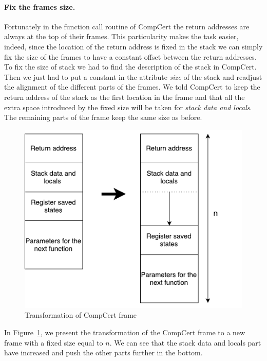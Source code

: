 \documentclass[11pt]{sdm}
\begin{document}
\paragraph{Fix the frames size.}
\label{par:Fix the frames size}

Fortunately in the function call routine of CompCert the return addresses are always at the top of their frames.
This particularity makes the task easier, indeed, since the location of the return address is fixed in the stack we can simply fix the size of the frames to have a constant offset between the return addresses. \\
To fix the size of stack we had to find the description of the stack in CompCert. Then we just had to put a constant in the attribute \textit{size} of the stack and readjust the alignment of the different parts of the frames. We told CompCert to keep the return address of the stack as the first location in the frame and that all the extra space introduced by the fixed size will be taken for  \textit{stack data and locals}. The remaining parts of the frame keep the same size as before.

\begin{figure}[!ht]
\centering
\includegraphics[scale=0.6]{images/frame_transform.pdf}
\caption{Transformation of CompCert frame}
\label{frame_transform}
\end{figure}

In Figure~\ref{frame_transform}, we present the transformation of the CompCert frame to a new frame with a fixed size equal to $n$. We can see that the stack data and locals part have increased and push the other parts further in the bottom.
\end{document}
